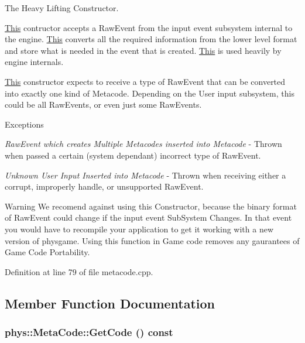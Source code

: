 The Heavy Lifting Constructor. 

\hyperlink{structThis}{This} contructor accepts a RawEvent from the input event subsystem internal to the engine. \hyperlink{structThis}{This} converts all the required information from the lower level format and store what is needed in the event that is created. \hyperlink{structThis}{This} is used heavily by engine internals. \par
 \hyperlink{structThis}{This} constructor expects to receive a type of RawEvent that can be converted into exactly one kind of Metacode. Depending on the User input subsystem, this could be all RawEvents, or even just some RawEvents. 
\begin{DoxyExceptions}{Exceptions}
\item[{\em RawEvent which creates Multiple Metacodes inserted into Metacode}]-\/ Thrown when passed a certain (system dependant) incorrect type of RawEvent. \item[{\em Unknown User Input Inserted into Metacode}]-\/ Thrown when receiving either a corrupt, improperly handle, or unsupported RawEvent. \end{DoxyExceptions}
\begin{DoxyWarning}{Warning}
We recomend against using this Constructor, because the binary format of RawEvent could change if the input event SubSystem Changes. In that event you would have to recompile your application to get it working with a new version of physgame. Using this function in Game code removes any gaurantees of Game Code Portability. 
\end{DoxyWarning}


Definition at line 79 of file metacode.cpp.



\subsection{Member Function Documentation}
\hypertarget{classphys_1_1MetaCode_a5835a05391cbb5a3dc83534a7bcf87d3}{
\subsubsection[{GetCode}]{ phys::MetaCode::GetCode () const}}
\label{da/dc9/classphys_1_1MetaCode_a5835a05391cbb5a3dc83534a7bcf87d3}


